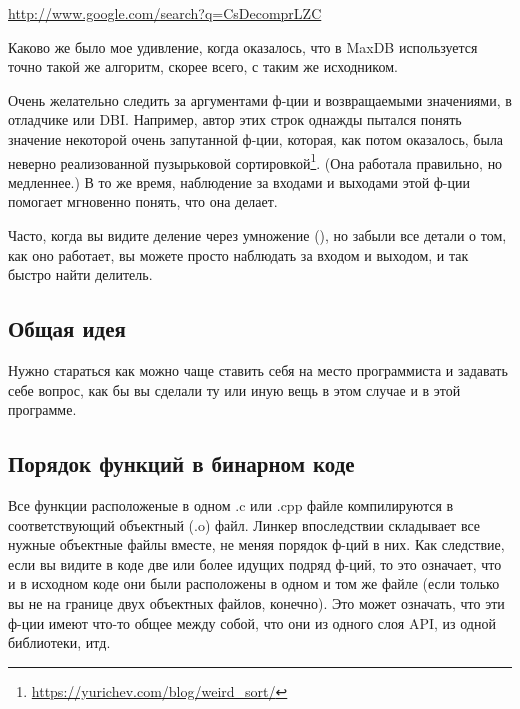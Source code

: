 \url{http://www.google.com/search?q=CsDecomprLZC}

Каково же было мое удивление, когда оказалось, что в MaxDB используется точно такой же алгоритм, 
скорее всего, с таким же исходником.




Очень желательно следить за аргументами ф-ции и возвращаемыми значениями, в отладчике или \ac{DBI}.
Например, автор этих строк однажды пытался понять значение некоторой очень запутанной ф-ции, которая, как потом оказалось,
была неверно реализованной пузырьковой сортировкой\footnote{\url{https://yurichev.com/blog/weird_sort/}}.
(Она работала правильно, но медленнее.)
В то же время, наблюдение за входами и выходами этой ф-ции помогает мгновенно понять, что она делает.

Часто, когда вы видите деление через умножение (),
но забыли все детали о том, как оно работает, вы можете просто наблюдать за входом и выходом, и так быстро найти делитель.














\subsection{Общая идея}

Нужно стараться как можно чаще ставить себя на место программиста и задавать себе вопрос, 
как бы вы сделали ту или иную вещь в этом случае и в этой программе.

\subsection{Порядок функций в бинарном коде}

Все функции расположеные в одном .c или .cpp файле компилируются в соответствующий объектный (.o) файл.
Линкер впоследствии складывает все нужные объектные файлы вместе, не меняя порядок ф-ций в них.
Как следствие, если вы видите в коде две или более идущих подряд ф-ций, то это означает, что и в исходном коде они 
были расположены в одном и том же файле (если только вы не на границе двух объектных файлов, конечно).
Это может означать, что эти ф-ции имеют что-то общее между собой, что они из одного слоя \ac{API}, из одной библиотеки, итд.

